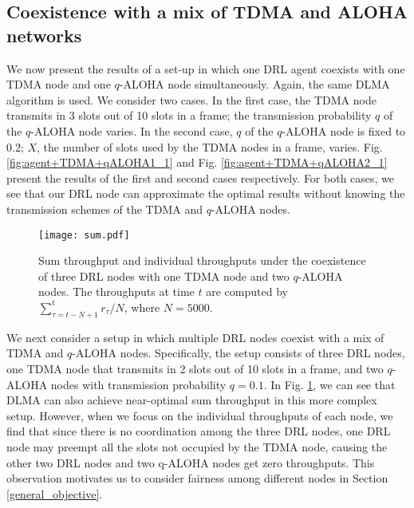 \documentclass[journal,comsoc]{IEEEtran}
\begin{document}
\subsection{Coexistence with a mix of TDMA and ALOHA networks}\label{mix1}
We now present the results of a set-up in which one DRL agent coexists with one TDMA node and one  $ q $-ALOHA node simultaneously. Again, the same DLMA algorithm is used. We consider two cases. In the first case, the TDMA node transmits in 3 slots out of 10 slots in a frame; the transmission probability  $ q $ of the  $ q $-ALOHA node varies. In the second case,  $ q $ of the  $ q $-ALOHA node is fixed to 0.2;  $ X $, the number of slots used by the TDMA nodes in a frame, varies. Fig. \ref{fig:agent+TDMA+qALOHA1_1} and Fig. \ref{fig:agent+TDMA+qALOHA2_1} present the results of the first and second cases respectively. For both cases, we see that our DRL node can approximate the optimal results without knowing the transmission schemes of the TDMA and  $ q $-ALOHA nodes. 
\begin{figure}[!t]
	\centering
	\texttt{[image: sum.pdf]}
	\caption{Sum throughput and individual throughputs under the coexistence of three DRL nodes with one TDMA node and two $  q $-ALOHA nodes. The throughputs at time $ t $ are computed by  $\sum\nolimits_{\tau  = t - N + 1}^t {{r_\tau }/N} $, where   $ N=5000 $.}
	\label{fig:sum}
\end{figure}

We next consider a setup in which multiple DRL nodes coexist with a mix of TDMA and  $ q $-ALOHA nodes. Specifically, the setup consists of three DRL nodes, one TDMA node that transmits in 2 slots out of 10 slots in a frame, and two  $ q $-ALOHA nodes with transmission probability  $ q=0.1 $. In Fig. \ref{fig:sum}, we can see that DLMA can also achieve near-optimal sum throughput in this more complex setup. However, when we focus on the individual throughputs of each node, we find that since there is no coordination among the three DRL nodes, one DRL node may preempt all the slots not occupied by the TDMA node, causing the other two DRL nodes and two q-ALOHA nodes get zero throughputs. This observation motivates us to consider fairness among different nodes in Section \ref{general_objective}.  
\end{document}

